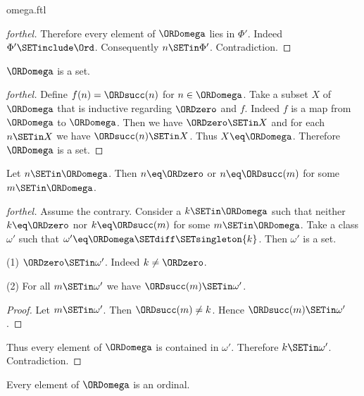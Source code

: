 \documentclass{naproche-library}
\begin{document}
\begin{smodule}[title=The Ordinal $\omega$]{omega.ftl}
\begin{proof}[forthel]
  Therefore every element of $\ORDomega$ lies in $\Phi'$.
  Indeed $\Phi' \SETinclude \Ord$.
  Consequently $n \SETin \Phi'$.
  Contradiction.
\end{proof}

\begin{corollary}[forthel,id=SET_THEORY_03_4847727433220096]
  $\ORDomega$ is a set.
\end{corollary}
\begin{proof}[forthel]
  Define $f(n) = \ORDsucc(n)$ for $n \in \ORDomega$.
  Take a subset $X$ of $\ORDomega$ that is inductive regarding $\ORDzero$ and $f$.
  Indeed $f$ is a map from $\ORDomega$ to $\ORDomega$.
  Then we have $\ORDzero \SETin X$ and for each $n \SETin X$ we have $\ORDsucc(n) \SETin X$.
  Thus $X \eq \ORDomega$.
  Therefore $\ORDomega$ is a set.
\end{proof}

\begin{proposition}[forthel,id=SET_THEORY_03_5885789275684864]
  Let $n \SETin \ORDomega$.
  Then $n \eq \ORDzero$ or $n \eq \ORDsucc(m)$ for some $m \SETin \ORDomega$.
\end{proposition}
\begin{proof}[forthel]
  Assume the contrary.
  Consider a $k \SETin \ORDomega$ such that neither $k \eq \ORDzero$ nor $k \eq \ORDsucc(m)$ for
  some $m \SETin \ORDomega$.
  Take a class $\omega'$ such that $\omega' \eq \ORDomega \SETdiff \SETsingleton{k}$. %
  Then $\omega'$ is a set.

  (1) $\ORDzero \SETin \omega'$.
  Indeed $k \neq \ORDzero$.

  (2) For all $m \SETin \omega'$ we have $\ORDsucc(m) \SETin \omega'$.
  \begin{proof}
    Let $m \SETin \omega'$.
    Then $\ORDsucc(m) \neq k$.
    Hence $\ORDsucc(m) \SETin \omega'$.
  \end{proof}

  Thus every element of $\ORDomega$ is contained in $\omega'$.
  Therefore $k \SETin \omega'$.
  Contradiction.
\end{proof}

\begin{proposition}[forthel,id=SET_THEORY_03_5057540872208384]
  Every element of $\ORDomega$ is an ordinal.
\end{proposition}
\end{smodule}
\end{document}
